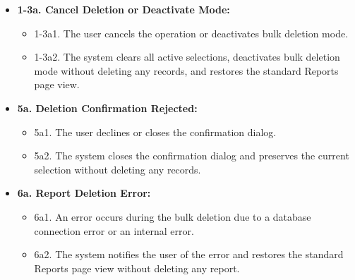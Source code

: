 \begin{itemize} [label={}, leftmargin=0.75cm, noitemsep]

\item \textbf{1-3a. Cancel Deletion or Deactivate Mode:}
\begin{itemize} [label={}, leftmargin=0.75cm, noitemsep]
    \item 1-3a1. The user cancels the operation or deactivates bulk deletion mode.
    \item 1-3a2. The system clears all active selections, deactivates bulk deletion mode without deleting any records, and restores the standard Reports page view.
\end{itemize}

\item \textbf{5a. Deletion Confirmation Rejected:}
\begin{itemize} [label={}, leftmargin=0.75cm, noitemsep]
    \item 5a1. The user declines or closes the confirmation dialog.
    \item 5a2. The system closes the confirmation dialog and preserves the current selection without deleting any records.
\end{itemize}

\item \textbf{6a. Report Deletion Error:}
\begin{itemize} [label={}, leftmargin=0.75cm, noitemsep]
    \item 6a1. An error occurs during the bulk deletion due to a database connection error or an internal error.
    \item 6a2. The system notifies the user of the error and restores the standard Reports page view without deleting any report.
\end{itemize}

\end{itemize}

\vspace{0.3cm}
